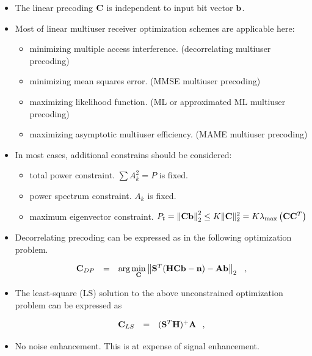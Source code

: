 \documentclass[20pt,landscape]{foils}
\newcommand{\bA}{{\mathbf A}}
\newcommand{\bb}{{\bf b}}
\newcommand{\bC}{{\bf C}}
\newcommand{\bn}{{\bf n}}
\newcommand{\bH}{{\bf H}}
\newcommand{\bS}{{\bf S}}
\begin{document}
\vspace{2.0in}{\Large Linear Multiuser Precoding}

\begin{itemize}
\item The linear precoding $\bC$ is independent to input bit
vector $\bb$.

\item Most of linear multiuser receiver optimization schemes are
applicable here:
    \begin{itemize}
    \item minimizing multiple access interference. (decorrelating multiuser precoding)
    \item minimizing mean squares error. (MMSE multiuser precoding)
    \item maximizing likelihood function. (ML or approximated ML multiuser precoding)
    \item maximizing asymptotic multiuser efficiency. (MAME multiuser precoding)
    \end{itemize}
\item In most cases, additional constrains should be considered:
    \begin{itemize}
    \item total power constraint. $\sum A_k^2=P$ is fixed.
    \item power spectrum constraint. $A_k$ is fixed.
    \item maximum eigenvector constraint.
    $P_t = \left\|\bC\bb\right\|_2^2\leq K\|\bC\|_2^2 = K\lambda_{\max}\left(\bC\bC^T\right)$
    \end{itemize}
\end{itemize}



\begin{itemize}
\item Decorrelating precoding can be expressed as in the following
optimization problem.

$$\begin{array}{rcl}
\bC_{DP}&=&\mbox{arg}\min\limits_{\bC}\left\|\bS^T(\bH\bC\bb-\bn)-\bA\bb\right\|_2\hspace{0.1in},
\end{array}\label{DD}$$

\item The least-square (LS) solution to the above unconstrained
optimization problem can be expressed as

$$\begin{array}{rcl}
\bC_{LS}&=&(\bS^T\bH)^{+}\bA\hspace{0.1in},
\end{array}\label{C-DDLS}$$

\item No noise enhancement. This is at expense of signal
enhancement.

\end{itemize}
\end{document}
